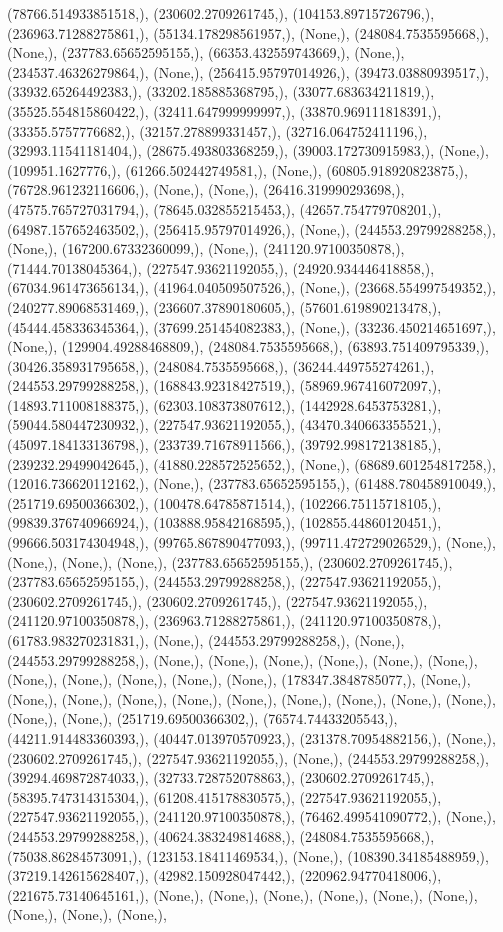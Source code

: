 \documentclass{article}
\begin{document}
(78766.514933851518,), (230602.2709261745,), (104153.89715726796,), (236963.71288275861,), (55134.178298561957,), (None,), (248084.7535595668,), (None,), (237783.65652595155,), (66353.432559743669,), (None,), (234537.46326279864,), (None,), (256415.95797014926,), (39473.03880939517,), (33932.65264492383,), (33202.185885368795,), (33077.683634211819,), (35525.554815860422,), (32411.647999999997,), (33870.969111818391,), (33355.5757776682,), (32157.278899331457,), (32716.064752411196,), (32993.11541181404,), (28675.493803368259,), (39003.172730915983,), (None,), (109951.1627776,), (61266.502442749581,), (None,), (60805.918920823875,), (76728.961232116606,), (None,), (None,), (26416.319990293698,), (47575.765727031794,), (78645.032855215453,), (42657.754779708201,), (64987.157652463502,), (256415.95797014926,), (None,), (244553.29799288258,), (None,), (167200.67332360099,), (None,), (241120.97100350878,), (71444.70138045364,), (227547.93621192055,), (24920.934446418858,), (67034.961473656134,), (41964.040509507526,), (None,), (23668.554997549352,), (240277.89068531469,), (236607.37890180605,), (57601.619890213478,), (45444.458336345364,), (37699.251454082383,), (None,), (33236.450214651697,), (None,), (129904.49288468809,), (248084.7535595668,), (63893.751409795339,), (30426.358931795658,), (248084.7535595668,), (36244.449755274261,), (244553.29799288258,), (168843.92318427519,), (58969.967416072097,), (14893.711008188375,), (62303.108373807612,), (1442928.6453753281,), (59044.580447230932,), (227547.93621192055,), (43470.340663355521,), (45097.184133136798,), (233739.71678911566,), (39792.998172138185,), (239232.29499042645,), (41880.228572525652,), (None,), (68689.601254817258,), (12016.736620112162,), (None,), (237783.65652595155,), (61488.780458910049,), (251719.69500366302,), (100478.64785871514,), (102266.75115718105,), (99839.376740966924,), (103888.95842168595,), (102855.44860120451,), (99666.503174304948,), (99765.867890477093,), (99711.472729026529,), (None,), (None,), (None,), (None,), (237783.65652595155,), (230602.2709261745,), (237783.65652595155,), (244553.29799288258,), (227547.93621192055,), (230602.2709261745,), (230602.2709261745,), (227547.93621192055,), (241120.97100350878,), (236963.71288275861,), (241120.97100350878,), (61783.983270231831,), (None,), (244553.29799288258,), (None,), (244553.29799288258,), (None,), (None,), (None,), (None,), (None,), (None,), (None,), (None,), (None,), (None,), (None,), (178347.3848785077,), (None,), (None,), (None,), (None,), (None,), (None,), (None,), (None,), (None,), (None,), (None,), (None,), (251719.69500366302,), (76574.74433205543,), (44211.914483360393,), (40447.013970570923,), (231378.70954882156,), (None,), (230602.2709261745,), (227547.93621192055,), (None,), (244553.29799288258,), (39294.469872874033,), (32733.728752078863,), (230602.2709261745,), (58395.747314315304,), (61208.415178830575,), (227547.93621192055,), (227547.93621192055,), (241120.97100350878,), (76462.499541090772,), (None,), (244553.29799288258,), (40624.383249814688,), (248084.7535595668,), (75038.86284573091,), (123153.18411469534,), (None,), (108390.34185488959,), (37219.142615628407,), (42982.150928047442,), (220962.94770418006,), (221675.73140645161,), (None,), (None,), (None,), (None,), (None,), (None,), (None,), (None,), (None,), 
\end{document}
